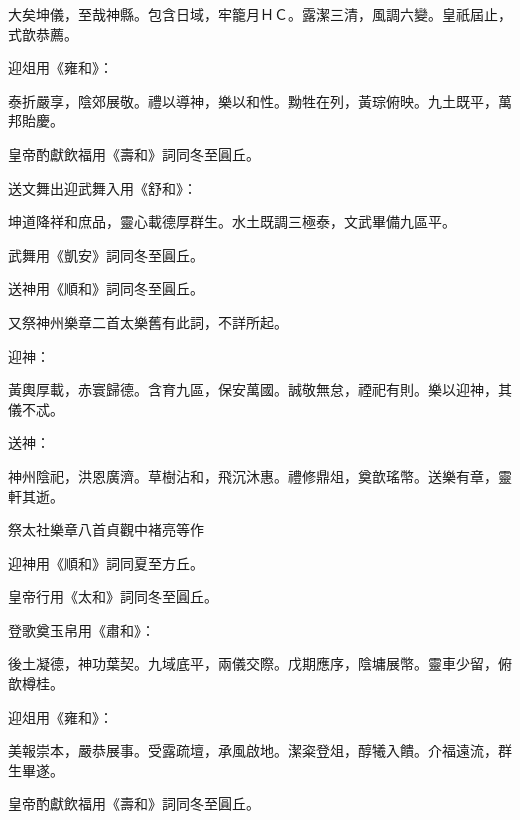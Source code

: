 \begin{pinyinscope}
 大矣坤儀，至哉神縣。包含日域，牢籠月ＨＣ。露潔三清，風調六變。皇祇屆止，式歆恭薦。



 迎俎用《雍和》：



 泰折嚴享，陰郊展敬。禮以導神，樂以和性。黝牲在列，黃琮俯映。九土既平，萬邦貽慶。



 皇帝酌獻飲福用《壽和》詞同冬至圓丘。



 送文舞出迎武舞入用《舒和》：



 坤道降祥和庶品，靈心載德厚群生。水土既調三極泰，文武畢備九區平。



 武舞用《凱安》詞同冬至圓丘。



 送神用《順和》詞同冬至圓丘。



 又祭神州樂章二首太樂舊有此詞，不詳所起。



 迎神：



 黃輿厚載，赤寰歸德。含育九區，保安萬國。誠敬無怠，禋祀有則。樂以迎神，其儀不忒。



 送神：



 神州陰祀，洪恩廣濟。草樹沾和，飛沉沐惠。禮修鼎俎，奠歆瑤幣。送樂有章，靈軒其逝。



 祭太社樂章八首貞觀中褚亮等作



 迎神用《順和》詞同夏至方丘。



 皇帝行用《太和》詞同冬至圓丘。



 登歌奠玉帛用《肅和》：



 後土凝德，神功葉契。九域底平，兩儀交際。戊期應序，陰墉展幣。靈車少留，俯歆樽桂。



 迎俎用《雍和》：



 美報崇本，嚴恭展事。受露疏壇，承風啟地。潔粢登俎，醇犧入饋。介福遠流，群生畢遂。



 皇帝酌獻飲福用《壽和》詞同冬至圓丘。




\end{pinyinscope}
